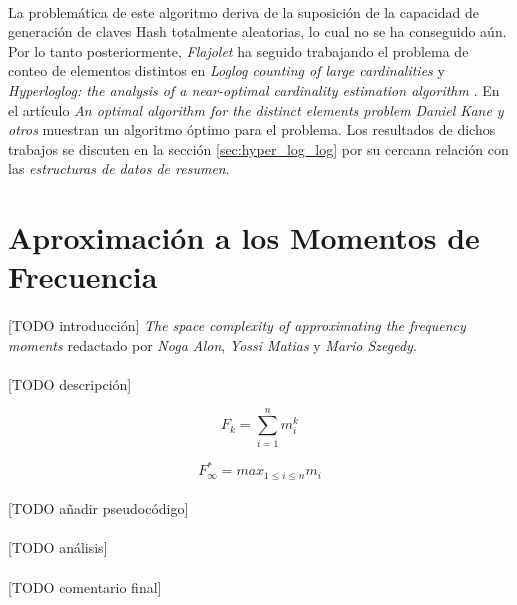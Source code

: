 \documentclass{subfiles}
\begin{document}
      \paragraph{}
      La problemática de este algoritmo deriva de la suposición de la capacidad de generación de claves Hash totalmente aleatorias, lo cual no se ha conseguido aún. Por lo tanto posteriormente, \emph{Flajolet} ha seguido trabajando el problema de conteo de elementos distintos en \emph{Loglog counting of large cardinalities} \cite{durand2003loglog} y \emph{Hyperloglog: the analysis of a near-optimal cardinality estimation algorithm} \cite{flajolet2007hyperloglog}. En el artículo \emph{An optimal algorithm for the distinct elements problem} \cite{kane2010optimal} \emph{Daniel Kane y otros} muestran un algoritmo óptimo para el problema. Los resultados de dichos trabajos se discuten en la sección \ref{sec:hyper_log_log} por su cercana relación con las \emph{estructuras de datos de resumen}.


    \section{Aproximación a los Momentos de Frecuencia}
    \label{sec:streaming_frecuency_moment_aproximation}

      \paragraph{}
      [TODO introducción] \emph{The space complexity of approximating the frequency moments} \cite{alon1996space} redactado por \emph{Noga Alon}, \emph{Yossi Matias} y \emph{Mario Szegedy}.

      \paragraph{}
      [TODO descripción]


      \begin{equation}
      \label{eq:frecuency_moments}
        F_k = \sum_{i=1}^n m_i^k
      \end{equation}

      \begin{equation}
      \label{eq:frecuency_moments_max}
        F_\infty^* = max_{1 \leq i \leq n} m_i
      \end{equation}


      \paragraph{}
      [TODO añadir pseudocódigo]

      \paragraph{}
      [TODO análisis]

      \paragraph{}
      [TODO comentario final]
\end{document}
